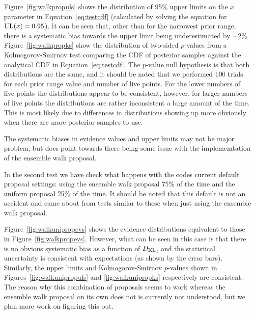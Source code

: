 Figure~\ref{fig:walkpropuls} shows the distribution of 95\% upper limits on the $x$ parameter in Equation~\ref{eq:testcdf} (calculated by solving
the equation for ${\rm UL}(x) = 0.95$). It can be seen that, other than for the narrowest prior range, there is a systematic bias towards the
upper limit being underestimated by $\sim 2\%$. Figure~\ref{fig:walkpropks} show the distribution of two-sided $p$-values from a Kolmogorov-Smirnov
test comparing the CDF of posterior samples against the analytical CDF in Equation~\ref{eq:testcdf}. The $p$-value null hypothesis is that both
distributions are the same, and it should be noted that we performed 100 trials for each prior range value and number of live points. For the
lower numbers of live points the distributions appear to be consistent, however, for larger numbers of live points the distributions are rather
inconsistent a large amount of the time. This is most likely due to differences in distributions showing up more obviously when there are more
posterior samples to use.

The systematic biases in evidence values and upper limits may not be major problem, but does point towards there being some issue with the
implememtation of the ensemble walk proposal.

In the second test we have check what happens with the codes current default proposal settings: using the ensemble walk proposal 75\%
of the time and the uniform proposal 25\% of the time. It should be noted that this default is not an accident and came about from tests
similar to these when just using the ensemble walk proposal.

Figure~\ref{fig:walkunipropevs} shows the evidence distributions equivalent to those in Figure~\ref{fig:walkpropevs}. However, what can
be seen in this case is that there is no obvious systematic bias as a function of $D_{\rm KL}$, and the statistical uncertainty is
consistent with expectations (as shown by the error bars). Similarly, the upper limits and Kolmogorov-Smirnov $p$-values shown in
Figures~\ref{fig:walkunipropuls} and \ref{fig:walkunipropks} respectively are consistent. The reason why this combination of proposals
seems to work whereas the ensemble walk proposal on its own does not is currently not understood, but we plan more work on figuring this
out.